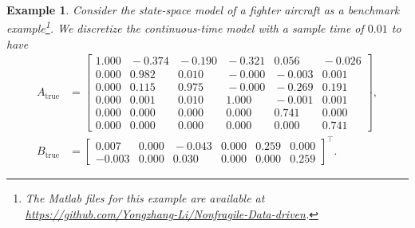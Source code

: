 \documentclass[9pt,shortpaper,twoside,web]{ieeecolor}
\newtheorem{example}[theorem]{Example}
\begin{document}
\begin{example}
\label{ex:nontoy}
Consider the state-space model of a fighter aircraft \cite[Ex. 10.1.2]{skelton1997unified} as a benchmark example\footnote{The Matlab files for this example are available at \href{https://github.com/Yongzhang-Li/Nonfragile-Data-driven-Control}{https://github.com/Yongzhang-Li/Nonfragile-Data-driven}.}. We discretize the continuous-time model with a sample time of $0.01$ to have
\begin{equation}
\begin{split}
A_\text{true}\!&=\!\begin{bmatrix}
    1.000 \!&\! -0.374 \!&\! -0.190 \!&\! -0.321 \!&\! 0.056  \!&\! -0.026 \\
    0.000 \!&\! 0.982  \!&\! 0.010  \!&\! -0.000 \!&\! -0.003 \!&\! 0.001  \\
    0.000 \!&\! 0.115  \!&\! 0.975  \!&\! -0.000 \!&\! -0.269 \!&\! 0.191  \\
    0.000 \!&\! 0.001  \!&\! 0.010  \!&\! 1.000  \!&\! -0.001 \!&\! 0.001  \\
    0.000 \!&\! 0.000  \!&\! 0.000  \!&\! 0.000  \!&\! 0.741  \!&\! 0.000  \\
    0.000 \!&\! 0.000  \!&\! 0.000  \!&\! 0.000  \!&\! 0.000  \!&\! 0.741
\end{bmatrix}\!,\\
B_\text{true}\!&=\!\begin{bmatrix}
    0.007  \!&\! 0.000 \!&\! -0.043 \!&\! 0.000 \!&\! 0.259 \!&\! 0.000 \\
    -0.003 \!&\! 0.000 \!&\! 0.030  \!&\! 0.000 \!&\! 0.000 \!&\! 0.259
\end{bmatrix}^\top.
\end{split}
\end{equation} \vspace{-0.5 cm}


\end{example}
\end{document}

